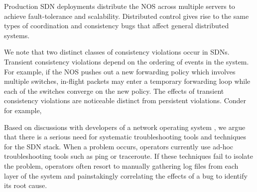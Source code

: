  Production SDN deployments distribute the NOS
 across multiple servers to achieve fault-tolerance
and scalability. Distributed control gives rise to the same types of coordination
and consistency bugs that affect general distributed systems. 

We note that two distinct classes of consistency violations occur in SDNs.
Transient consistency violations depend on the ordering of events in the system. For example,
if the  NOS pushes out a new forwarding policy
which involves multiple switches, in-flight packets may enter a
temporary forwarding loop while each of the switches converge on the new policy.
The effects of transient
consistency violations are noticeable distinct from persistent violations. Conder for example, 




Based on discussions with developers of a network operating system
\cite{Nicira}, we argue that there is a serious need for systematic troubleshooting
tools and techniques for the SDN stack. When a problem occurs,
operators currently use ad-hoc troubleshooting tools such as ping or traceroute.
If these techniques fail to isolate the problem, operators often resort to
manually gathering log files from each layer of the system and painstakingly
correlating the effects of a bug to identify its root cause.

